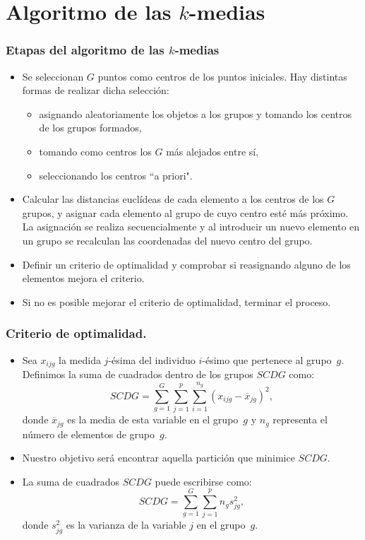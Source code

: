 \section{Algoritmo de las $k$-medias}
\begin{frame}
\frametitle{Etapas del algoritmo de las $k$-medias}
\begin{itemize}
\item<2->{Se seleccionan $G$ puntos como centros de los puntos iniciales. Hay distintas formas de realizar dicha selección:
\begin{itemize}
\item asignando aleatoriamente los objetos a los grupos y tomando los centros de los grupos formados,
\item tomando como centros los $G$ más alejados entre sí,
\item seleccionando los centros ``a priori".
\end{itemize}}
\item<3->{Calcular las distancias euclídeas de cada elemento a los centros de los $G$ grupos, y asignar cada elemento al grupo de cuyo centro esté más próximo. La asignación se realiza secuencialmente y al introducir un nuevo elemento en un grupo se recalculan las coordenadas del nuevo centro del grupo.}
\item<4->{Definir un criterio de optimalidad y comprobar si reasignando alguno de los elementos mejora el criterio.}
\item<5->{Si no es posible mejorar el criterio de optimalidad, terminar el proceso.}
\end{itemize}
\end{frame}
\begin{frame}
\frametitle{Criterio de optimalidad.}
\begin{itemize}
\item<2->{Sea $x_{ijg}$ la medida $j$-ésima del individuo $i$-ésimo que pertenece al grupo~$g$. Definimos la suma de cuadrados dentro de los grupos $SCDG$ como:
$$
SCDG = \sum_{g=1}^G\sum_{j=1}^p\sum_{i=1}^{n_g} (x_{ijg}-\overline{x}_{jg})^2,
$$
donde $\overline{x}_{jg}$ es la media de esta variable en el grupo~$g$ y $n_g$ representa el número de elementos de grupo~$g$.}
\item<3->{Nuestro objetivo será encontrar aquella partición que minimice $SCDG$.}
\item<4->{La suma de cuadrados $SCDG$ puede escribirse como:
$$
SCDG = \sum_{g=1}^G\sum_{j=1}^{p}  n_g s_{jg}^2,
$$
donde $s_{jg}^2$ es la varianza de la variable $j$ en el grupo~$g$.}
\end{itemize}
\end{frame}

